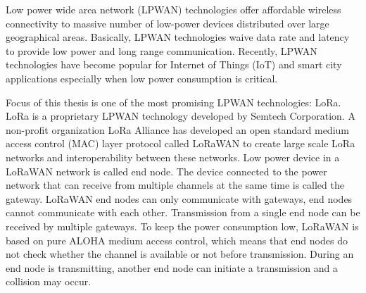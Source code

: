 Low power wide area network (LPWAN) technologies offer affordable wireless connectivity to massive number of low-power devices distributed over large geographical areas. Basically, LPWAN technologies waive data rate and latency to provide low power and long range communication. Recently, LPWAN technologies have become popular for Internet of Things (IoT) and smart city applications especially when low power consumption is critical.

Focus of this thesis is one of the most promising LPWAN technologies: LoRa. LoRa is a proprietary LPWAN technology developed by Semtech Corporation. A non-profit organization LoRa Alliance has developed an open standard medium access control (MAC) layer protocol called LoRaWAN to create large scale LoRa networks and interoperability between these networks. Low power device in a LoRaWAN network is called end node. The device connected to the power network that can receive from multiple channels at the same time is called the gateway. LoRaWAN end nodes can only communicate with gateways, end nodes cannot communicate with each other. Transmission from a single end node can be received by multiple gateways. To keep the power consumption low, LoRaWAN is based on pure ALOHA medium access control, which means that end nodes do not check whether the channel is available or not before transmission. During an end node is transmitting, another end node can initiate a transmission and a collision may occur.

